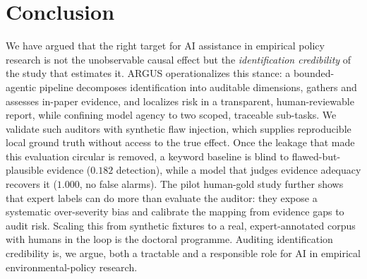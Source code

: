 \section{Conclusion}
\label{sec:conclusion}

We have argued that the right target for AI assistance in empirical policy
research is not the unobservable causal effect but the \emph{identification
credibility} of the study that estimates it. ARGUS operationalizes this stance: a
bounded-agentic pipeline decomposes identification into auditable dimensions,
gathers and assesses in-paper evidence, and localizes risk in a transparent,
human-reviewable report, while confining model agency to two scoped, traceable
sub-tasks. We validate such auditors with synthetic flaw injection, which
supplies reproducible local ground truth without access to the true effect. Once
the leakage that made this evaluation circular is removed, a keyword baseline is
blind to flawed-but-plausible evidence ($0.182$ detection), while a model that
judges evidence adequacy recovers it ($1.000$, no false alarms). The pilot
human-gold study further shows that expert labels can
do more than evaluate the auditor: they expose a systematic over-severity bias and
calibrate the mapping from evidence gaps to audit risk. Scaling this from
synthetic fixtures to a real, expert-annotated corpus with humans in the loop is
the doctoral programme. Auditing identification
credibility is, we argue, both a tractable and a responsible role for AI in
empirical environmental-policy research.
